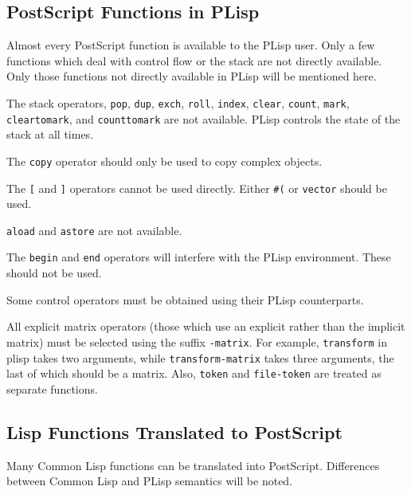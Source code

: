 \subsection{PostScript Functions in PLisp}
Almost every PostScript function is available to the PLisp user.  Only a
few functions which deal with control flow or the stack are not directly
available.  Only those functions not directly
available in PLisp will be mentioned here.

The stack operators, {\tt pop}, {\tt dup}, {\tt exch}, {\tt roll},
{\tt index}, {\tt clear}, {\tt count}, {\tt mark},
{\tt cleartomark}, and {\tt counttomark} are not available.  PLisp
controls the state of the stack at all times.

The {\tt copy} operator should only be used to copy complex objects.

The {\tt [} and {\tt ]} operators cannot be used directly.  Either
{\tt \#(} or {\tt vector} should be used.

{\tt aload} and {\tt astore} are not available.

The {\tt begin} and {\tt end} operators will interfere with the PLisp
environment. These should not be used.

Some control operators must be obtained using their PLisp counterparts.

All explicit matrix operators (those which use an explicit rather than
the implicit matrix) must be selected using the suffix {\tt -matrix}.
For example, {\tt transform} in plisp takes two arguments, while
{\tt transform-matrix} takes three 
arguments, the last of which should be a matrix.  Also, {\tt token}
and {\tt file-token} are treated as separate functions.

\subsection{Lisp Functions Translated to PostScript}
Many Common Lisp functions can be translated into PostScript.  Differences
between Common Lisp and PLisp semantics will be noted.

